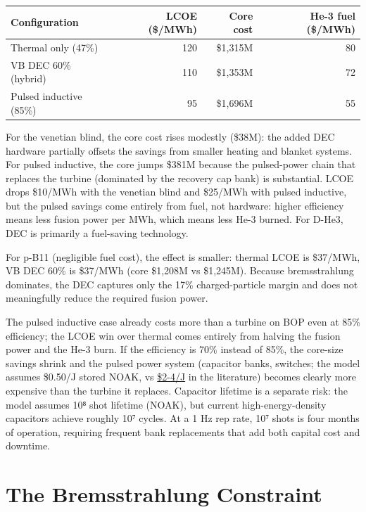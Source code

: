 \documentclass{article}
\begin{document}
\begin{table}[h]
\centering
\begin{tabular}{lrrr}
\toprule
Configuration & LCOE (\$/MWh) & Core cost & He-3 fuel (\$/MWh) \\
\midrule
Thermal only (47\%) & 120 & \$1,315M & 80 \\
VB DEC 60\% (hybrid) & 110 & \$1,353M & 72 \\
Pulsed inductive (85\%) & 95 & \$1,696M & 55 \\
\bottomrule
\end{tabular}
\end{table}

For the venetian blind, the core cost rises modestly (\$38M): the added
DEC hardware partially offsets the savings from smaller heating and
blanket systems. For pulsed inductive, the core jumps \$381M because the
pulsed-power chain that replaces the turbine (dominated by the recovery
cap bank) is substantial. LCOE drops \$10/MWh with the venetian blind
and \$25/MWh with pulsed inductive, but the pulsed savings come entirely
from fuel, not hardware: higher efficiency means less fusion power per
MWh, which means less He-3 burned. For D-He3, DEC is primarily a
fuel-saving technology.

For p-B11 (negligible fuel cost), the effect is smaller: thermal LCOE is
\$37/MWh, VB DEC 60\% is \$37/MWh (core \$1,208M vs \$1,245M). Because
bremsstrahlung dominates, the DEC captures only the 17\%
charged-particle margin and does not meaningfully reduce the required
fusion power.

The pulsed inductive case already costs more than a turbine on BOP even
at 85\% efficiency; the LCOE win over thermal comes entirely from
halving the fusion power and the He-3 burn. If the efficiency is 70\%
instead of 85\%, the core-size savings shrink and the pulsed power
system (capacitor banks, switches; the model assumes \$0.50/J stored
NOAK, vs \href{https://arxiv.org/abs/2602.19389}{\$2-4/J} in the
literature) becomes clearly more expensive than the turbine it replaces.
Capacitor lifetime is a separate risk: the model assumes 10⁸ shot
lifetime (NOAK), but current high-energy-density capacitors achieve
roughly 10⁷ cycles. At a 1 Hz rep rate, 10⁷ shots is four months
of operation, requiring frequent bank replacements that add both capital
cost and downtime.

\section{The Bremsstrahlung Constraint}\label{the-bremsstrahlung-constraint}
\end{document}
